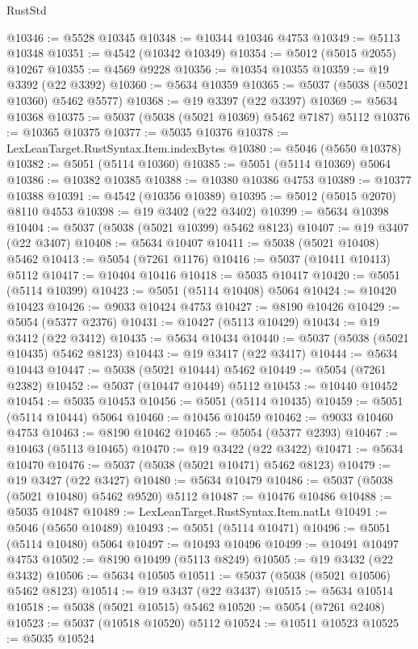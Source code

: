 \begin{lexlean}{RustStd}
\begin{coremodule}
@10346 := @5528 @10345
@10348 := @10344 @10346 @4753
@10349 := @5113 @10348
@10351 := @4542 (@10342 @10349)
@10354 := @5012 (@5015 @2055) @10267
@10355 := @4569 @9228
@10356 := @10354 @10355
@10359 := @19 @3392 (@22 @3392)
@10360 := @5634 @10359
@10365 := @5037 (@5038 (@5021 @10360) @5462 @5577)
@10368 := @19 @3397 (@22 @3397)
@10369 := @5634 @10368
@10375 := @5037 (@5038 (@5021 @10369) @5462 @7187) @5112
@10376 := @10365 @10375
@10377 := @5035 @10376
@10378 := LexLeanTarget.RustSyntax.Item.indexBytes
@10380 := @5046 (@5650 @10378)
@10382 := @5051 (@5114 @10360)
@10385 := @5051 (@5114 @10369) @5064
@10386 := @10382 @10385
@10388 := @10380 @10386 @4753
@10389 := @10377 @10388
@10391 := @4542 (@10356 @10389)
@10395 := @5012 (@5015 @2070) @8110 @4553
@10398 := @19 @3402 (@22 @3402)
@10399 := @5634 @10398
@10404 := @5037 (@5038 (@5021 @10399) @5462 @8123)
@10407 := @19 @3407 (@22 @3407)
@10408 := @5634 @10407
@10411 := @5038 (@5021 @10408) @5462
@10413 := @5054 (@7261 @1176)
@10416 := @5037 (@10411 @10413) @5112
@10417 := @10404 @10416
@10418 := @5035 @10417
@10420 := @5051 (@5114 @10399)
@10423 := @5051 (@5114 @10408) @5064
@10424 := @10420 @10423
@10426 := @9033 @10424 @4753
@10427 := @8190 @10426
@10429 := @5054 (@5377 @2376)
@10431 := @10427 (@5113 @10429)
@10434 := @19 @3412 (@22 @3412)
@10435 := @5634 @10434
@10440 := @5037 (@5038 (@5021 @10435) @5462 @8123)
@10443 := @19 @3417 (@22 @3417)
@10444 := @5634 @10443
@10447 := @5038 (@5021 @10444) @5462
@10449 := @5054 (@7261 @2382)
@10452 := @5037 (@10447 @10449) @5112
@10453 := @10440 @10452
@10454 := @5035 @10453
@10456 := @5051 (@5114 @10435)
@10459 := @5051 (@5114 @10444) @5064
@10460 := @10456 @10459
@10462 := @9033 @10460 @4753
@10463 := @8190 @10462
@10465 := @5054 (@5377 @2393)
@10467 := @10463 (@5113 @10465)
@10470 := @19 @3422 (@22 @3422)
@10471 := @5634 @10470
@10476 := @5037 (@5038 (@5021 @10471) @5462 @8123)
@10479 := @19 @3427 (@22 @3427)
@10480 := @5634 @10479
@10486 := @5037 (@5038 (@5021 @10480) @5462 @9520) @5112
@10487 := @10476 @10486
@10488 := @5035 @10487
@10489 := LexLeanTarget.RustSyntax.Item.natLt
@10491 := @5046 (@5650 @10489)
@10493 := @5051 (@5114 @10471)
@10496 := @5051 (@5114 @10480) @5064
@10497 := @10493 @10496
@10499 := @10491 @10497 @4753
@10502 := @8190 @10499 (@5113 @8249)
@10505 := @19 @3432 (@22 @3432)
@10506 := @5634 @10505
@10511 := @5037 (@5038 (@5021 @10506) @5462 @8123)
@10514 := @19 @3437 (@22 @3437)
@10515 := @5634 @10514
@10518 := @5038 (@5021 @10515) @5462
@10520 := @5054 (@7261 @2408)
@10523 := @5037 (@10518 @10520) @5112
@10524 := @10511 @10523
@10525 := @5035 @10524

\end{coremodule}
\end{lexlean}
